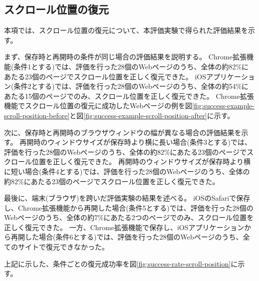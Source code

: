 \subsection{スクロール位置の復元}
本項では、スクロール位置の復元について、本評価実験で得られた評価結果を示す。

まず、保存時と再開時の条件が同じ場合の評価結果を説明する。
Chrome拡張機能(条件1とする)では、評価を行った28個のWebページのうち、全体の約82\%にあたる23個のページでスクロール位置を正しく復元できた。
iOSアプリケーション(条件2とする)では、評価を行った28個のWebページのうち、全体の約54\%にあたる15個のページでのみ、スクロール位置を正しく復元できた。
Chrome拡張機能でスクロール位置の復元に成功したWebページの例を図\ref{fig:success-example-scroll-position-before}と図\ref{fig:success-example-scroll-position-after}に示す。

次に、保存時と再開時のブラウザウィンドウの幅が異なる場合の評価結果を示す。
再開時のウィンドウサイズが保存時より横に長い場合(条件3とする)では、評価を行った28個のWebページのうち、全体の約82\%にあたる23個のページでスクロール位置を正しく復元できた。
再開時のウィンドウサイズが保存時より横に短い場合(条件4とする)では、評価を行った28個のWebページのうち、全体の約82\%にあたる23個のページでスクロール位置を正しく復元できた。

最後に、端末(ブラウザ)を跨いだ評価実験の結果を述べる。
iOSのSafariで保存し、Chrome拡張機能から再開した場合(条件5とする)では、評価を行った28個のWebページのうち、全体の約7\%にあたる2つのページでのみ、スクロール位置を正しく復元できた。
一方、Chrome拡張機能で保存し、iOSアプリケーションから再開した場合(条件6とする)では、評価を行った28個のWebページのうち、全てのサイトで復元できなかった。

上記に示した、条件ごとの復元成功率を図\ref{fig:success-rate-scroll-position}に示す。

